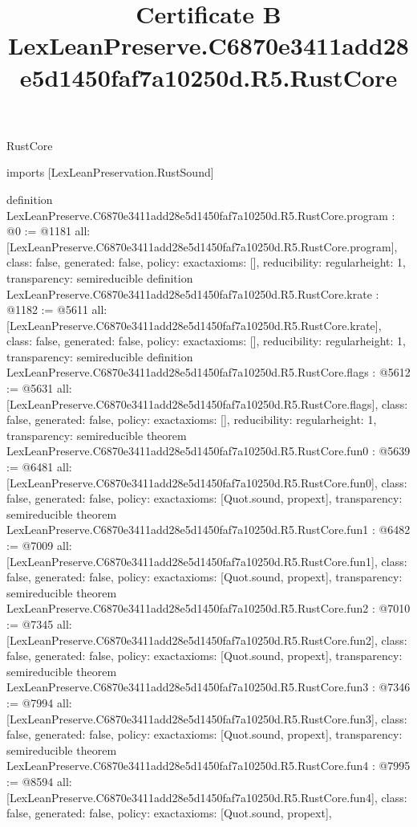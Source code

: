 \begin{lexlean}{RustCore}
\title{Certificate B LexLeanPreserve.C6870e3411add28e5d1450faf7a10250d.R5.RustCore}
\begin{coremodule}
imports [LexLeanPreservation.RustSound]

definition LexLeanPreserve.C6870e3411add28e5d1450faf7a10250d.R5.RustCore.program : @0 := @1181 {
  all: [LexLeanPreserve.C6870e3411add28e5d1450faf7a10250d.R5.RustCore.program],
  class: false,
  generated: false,
  policy: exact{axioms: []},
  reducibility: regular{height: 1},
  transparency: semireducible
}
definition LexLeanPreserve.C6870e3411add28e5d1450faf7a10250d.R5.RustCore.krate : @1182 := @5611 {
  all: [LexLeanPreserve.C6870e3411add28e5d1450faf7a10250d.R5.RustCore.krate],
  class: false,
  generated: false,
  policy: exact{axioms: []},
  reducibility: regular{height: 1},
  transparency: semireducible
}
definition LexLeanPreserve.C6870e3411add28e5d1450faf7a10250d.R5.RustCore.flags : @5612 := @5631 {
  all: [LexLeanPreserve.C6870e3411add28e5d1450faf7a10250d.R5.RustCore.flags],
  class: false,
  generated: false,
  policy: exact{axioms: []},
  reducibility: regular{height: 1},
  transparency: semireducible
}
theorem LexLeanPreserve.C6870e3411add28e5d1450faf7a10250d.R5.RustCore.fun0 : @5639 := @6481 {
  all: [LexLeanPreserve.C6870e3411add28e5d1450faf7a10250d.R5.RustCore.fun0],
  class: false,
  generated: false,
  policy: exact{axioms: [Quot.sound, propext]},
  transparency: semireducible
}
theorem LexLeanPreserve.C6870e3411add28e5d1450faf7a10250d.R5.RustCore.fun1 : @6482 := @7009 {
  all: [LexLeanPreserve.C6870e3411add28e5d1450faf7a10250d.R5.RustCore.fun1],
  class: false,
  generated: false,
  policy: exact{axioms: [Quot.sound, propext]},
  transparency: semireducible
}
theorem LexLeanPreserve.C6870e3411add28e5d1450faf7a10250d.R5.RustCore.fun2 : @7010 := @7345 {
  all: [LexLeanPreserve.C6870e3411add28e5d1450faf7a10250d.R5.RustCore.fun2],
  class: false,
  generated: false,
  policy: exact{axioms: [Quot.sound, propext]},
  transparency: semireducible
}
theorem LexLeanPreserve.C6870e3411add28e5d1450faf7a10250d.R5.RustCore.fun3 : @7346 := @7994 {
  all: [LexLeanPreserve.C6870e3411add28e5d1450faf7a10250d.R5.RustCore.fun3],
  class: false,
  generated: false,
  policy: exact{axioms: [Quot.sound, propext]},
  transparency: semireducible
}
theorem LexLeanPreserve.C6870e3411add28e5d1450faf7a10250d.R5.RustCore.fun4 : @7995 := @8594 {
  all: [LexLeanPreserve.C6870e3411add28e5d1450faf7a10250d.R5.RustCore.fun4],
  class: false,
  generated: false,
  policy: exact{axioms: [Quot.sound, propext]},
}
\end{coremodule}
\end{lexlean}
